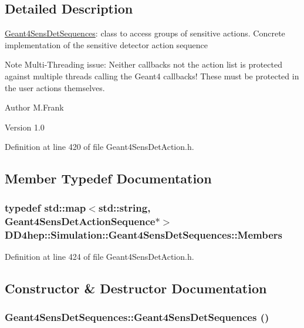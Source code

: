 \subsection{Detailed Description}
\hyperlink{class_d_d4hep_1_1_simulation_1_1_geant4_sens_det_sequences}{Geant4SensDetSequences}: class to access groups of sensitive actions. Concrete implementation of the sensitive detector action sequence

Note Multi-\/Threading issue: Neither callbacks not the action list is protected against multiple threads calling the Geant4 callbacks! These must be protected in the user actions themselves.

\begin{DoxyAuthor}{Author}
M.Frank 
\end{DoxyAuthor}
\begin{DoxyVersion}{Version}
1.0 
\end{DoxyVersion}


Definition at line 420 of file Geant4SensDetAction.h.

\subsection{Member Typedef Documentation}
\hypertarget{class_d_d4hep_1_1_simulation_1_1_geant4_sens_det_sequences_a2266138a517dd9b784af9234312fdd12}{
\subsubsection[{Members}]{\setlength{\rightskip}{0pt plus 5cm}typedef std::map$<$std::string, {\bf Geant4SensDetActionSequence}$\ast$$>$ {\bf DD4hep::Simulation::Geant4SensDetSequences::Members}}}
\label{class_d_d4hep_1_1_simulation_1_1_geant4_sens_det_sequences_a2266138a517dd9b784af9234312fdd12}


Definition at line 424 of file Geant4SensDetAction.h.

\subsection{Constructor \& Destructor Documentation}
\hypertarget{class_d_d4hep_1_1_simulation_1_1_geant4_sens_det_sequences_a5a78304dcb1472bf7a7de1b4305a264f}{
\subsubsection[{Geant4SensDetSequences}]{\setlength{\rightskip}{0pt plus 5cm}Geant4SensDetSequences::Geant4SensDetSequences ()}}
\label{class_d_d4hep_1_1_simulation_1_1_geant4_sens_det_sequences_a5a78304dcb1472bf7a7de1b4305a264f}


